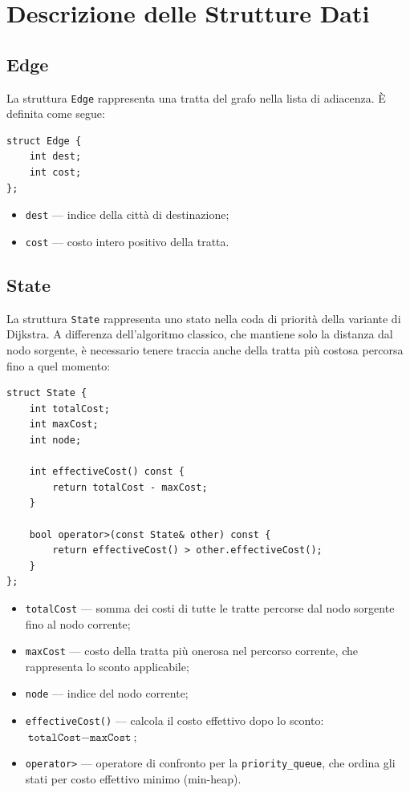 \chapter{Descrizione delle Strutture Dati}

\section{Edge}

La struttura \texttt{Edge} rappresenta una tratta del grafo nella lista 
di adiacenza. È definita come segue:

\begin{lstlisting}
struct Edge {
    int dest;
    int cost;
};
\end{lstlisting}

\begin{itemize}
    \item \texttt{dest} --- indice della città di destinazione;
    \item \texttt{cost} --- costo intero positivo della tratta.
\end{itemize}

\section{State}

La struttura \texttt{State} rappresenta uno stato nella coda di priorità 
della variante di Dijkstra. A differenza dell'algoritmo classico, che 
mantiene solo la distanza dal nodo sorgente, è necessario tenere traccia 
anche della tratta più costosa percorsa fino a quel momento:

\begin{lstlisting}
struct State {
    int totalCost;
    int maxCost;
    int node;

    int effectiveCost() const {
        return totalCost - maxCost;
    }

    bool operator>(const State& other) const {
        return effectiveCost() > other.effectiveCost();
    }
};
\end{lstlisting}

\begin{itemize}
    \item \texttt{totalCost} --- somma dei costi di tutte le tratte 
    percorse dal nodo sorgente fino al nodo corrente;
    \item \texttt{maxCost} --- costo della tratta più onerosa nel 
    percorso corrente, che rappresenta lo sconto applicabile;
    \item \texttt{node} --- indice del nodo corrente;
    \item \texttt{effectiveCost()} --- calcola il costo effettivo dopo 
    lo sconto: $\texttt{totalCost} - \texttt{maxCost}$;
    \item \texttt{operator>} --- operatore di confronto per la 
    \texttt{priority\_queue}, che ordina gli stati per costo effettivo 
    minimo (min-heap).
\end{itemize}

